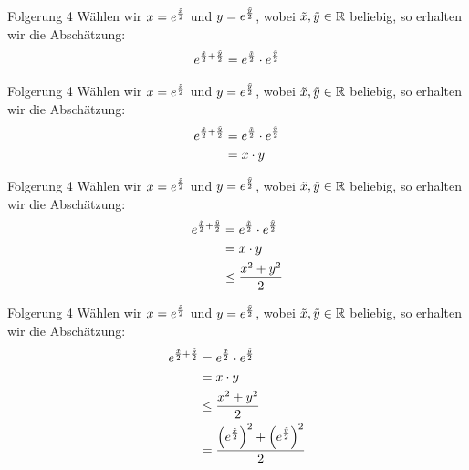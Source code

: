\documentclass[10pt]{beamer}
\def\bR{\mathbb{R}}
\begin{document}
\begin{frame}{Folgerung 4}
    Wählen wir \( x = e^{\frac{\Tilde{x}}{2}} \) und \( y = e^{\frac{\Tilde{y}}{2}} \), wobei \( \Tilde{x}, \Tilde{y} \in \bR \) beliebig, so erhalten wir die Abschätzung:
    \begin{align*}
        e^{\frac{\Tilde{x}}{2} + \frac{\Tilde{y}}{2}}
        & = e^{\frac{\Tilde{x}}{2}} \cdot e^{\frac{\Tilde{y}}{2}} \\
    \end{align*}
\end{frame}



\begin{frame}{Folgerung 4}
    Wählen wir \( x = e^{\frac{\Tilde{x}}{2}} \) und \( y = e^{\frac{\Tilde{y}}{2}} \), wobei \( \Tilde{x}, \Tilde{y} \in \bR \) beliebig, so erhalten wir die Abschätzung:
    \begin{align*}
        e^{\frac{\Tilde{x}}{2} + \frac{\Tilde{y}}{2}}
        & = e^{\frac{\Tilde{x}}{2}} \cdot e^{\frac{\Tilde{y}}{2}} \\
        & = x \cdot y \\
    \end{align*}
\end{frame}



\begin{frame}{Folgerung 4}
    Wählen wir \( x = e^{\frac{\Tilde{x}}{2}} \) und \( y = e^{\frac{\Tilde{y}}{2}} \), wobei \( \Tilde{x}, \Tilde{y} \in \bR \) beliebig, so erhalten wir die Abschätzung:
    \begin{align*}
        e^{\frac{\Tilde{x}}{2} + \frac{\Tilde{y}}{2}}
        & = e^{\frac{\Tilde{x}}{2}} \cdot e^{\frac{\Tilde{y}}{2}} \\
        & = x \cdot y \\
        & \leq \frac{x^{2} + y^{2}}{2} \\
    \end{align*}
\end{frame}



\begin{frame}{Folgerung 4}
    Wählen wir \( x = e^{\frac{\Tilde{x}}{2}} \) und \( y = e^{\frac{\Tilde{y}}{2}} \), wobei \( \Tilde{x}, \Tilde{y} \in \bR \) beliebig, so erhalten wir die Abschätzung:
    \begin{align*}
        e^{\frac{\Tilde{x}}{2} + \frac{\Tilde{y}}{2}}
        & = e^{\frac{\Tilde{x}}{2}} \cdot e^{\frac{\Tilde{y}}{2}} \\
        & = x \cdot y \\
        & \leq \frac{x^{2} + y^{2}}{2} \\
        & = \frac{\left( e^{\frac{\Tilde{x}}{2}} \right)^{2} + \left( e^{\frac{\Tilde{y}}{2}} \right)^{2}}{2} \\
    \end{align*}
\end{frame}
\end{document}
